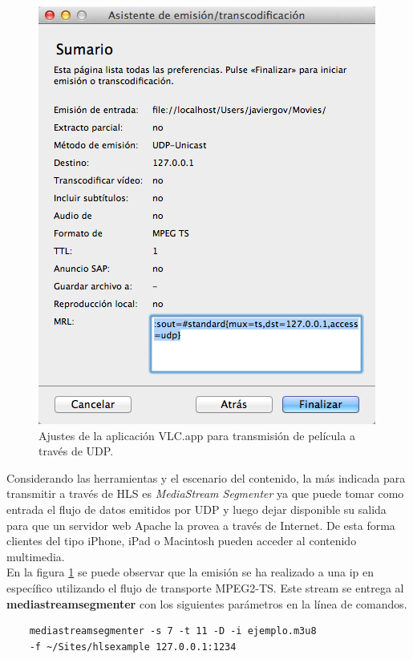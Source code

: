 \begin{figure}[H]
	\centering
	\includegraphics[scale=0.5]{imgs/vlc_transmission.png}
	\caption{Ajustes de la aplicación VLC.app para transmisión de película a través de UDP.}
	\label{vlc_transmission}	
\end{figure}


Considerando las herramientas y el escenario del contenido, la más indicada para transmitir a través de HLS es \textit{MediaStream Segmenter} ya que puede tomar como entrada el flujo de datos emitidos por UDP y luego dejar disponible su salida para que un servidor web Apache la provea a través de Internet. De esta forma clientes del tipo iPhone, iPad o Macintosh pueden acceder al contenido multimedia.\\

En la figura \ref{vlc_transmission} se puede observar que la emisión se ha realizado a una ip en específico utilizando el flujo de transporte MPEG2-TS. Este stream se entrega al \textbf{mediastreamsegmenter} con los siguientes parámetros en la línea de comandos.

 \begin{lstlisting}
	mediastreamsegmenter -s 7 -t 11 -D -i ejemplo.m3u8 
	-f ~/Sites/hlsexample 127.0.0.1:1234
\end{lstlisting}

